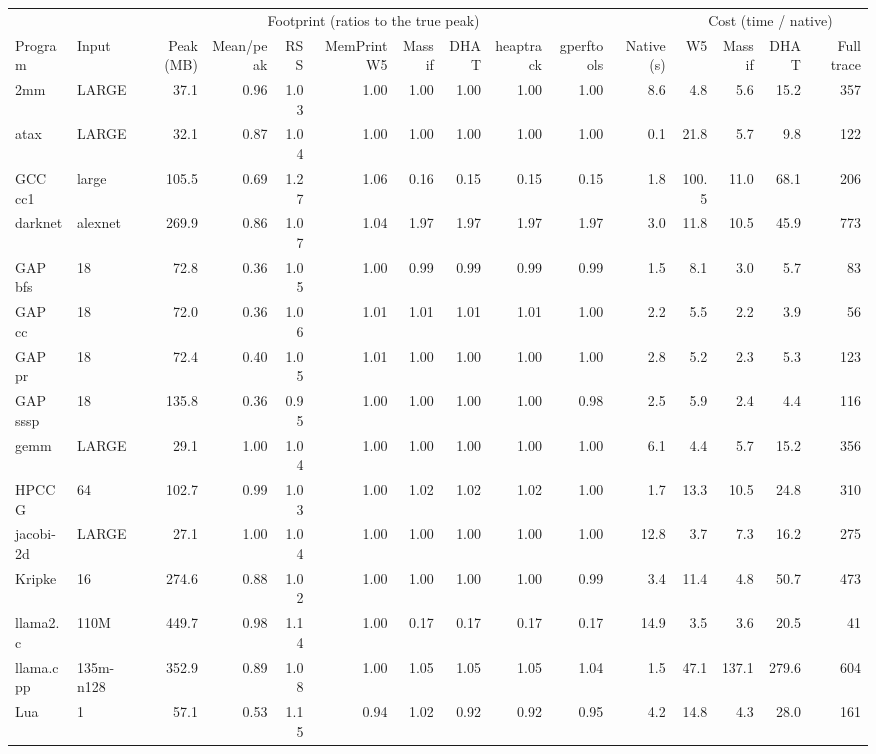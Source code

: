 \begin{tabular}{llrrrrrrrrrrrrr}
\toprule
 & & \multicolumn{8}{c}{Footprint (ratios to the true peak)} & & \multicolumn{4}{c}{Cost (time / native)} \\
\cmidrule(lr){3-10} \cmidrule(lr){12-15}
Program & Input & Peak (MB) & Mean/peak & RSS & MemPrint W5 & Massif & DHAT & heaptrack & gperftools & Native (s) & W5 & Massif & DHAT & Full trace \\
\midrule
2mm & LARGE & 37.1 & 0.96 & 1.03 & 1.00 & 1.00 & 1.00 & 1.00 & 1.00 & 8.6 & 4.8 & 5.6 & 15.2 & 357 \\
atax & LARGE & 32.1 & 0.87 & 1.04 & 1.00 & 1.00 & 1.00 & 1.00 & 1.00 & 0.1 & 21.8 & 5.7 & 9.8 & 122 \\
GCC cc1 & large & 105.5 & 0.69 & 1.27 & 1.06 & 0.16 & 0.15 & 0.15 & 0.15 & 1.8 & 100.5 & 11.0 & 68.1 & 206 \\
darknet & alexnet & 269.9 & 0.86 & 1.07 & 1.04 & 1.97 & 1.97 & 1.97 & 1.97 & 3.0 & 11.8 & 10.5 & 45.9 & 773 \\
GAP bfs & 18 & 72.8 & 0.36 & 1.05 & 1.00 & 0.99 & 0.99 & 0.99 & 0.99 & 1.5 & 8.1 & 3.0 & 5.7 & 83 \\
GAP cc & 18 & 72.0 & 0.36 & 1.06 & 1.01 & 1.01 & 1.01 & 1.01 & 1.00 & 2.2 & 5.5 & 2.2 & 3.9 & 56 \\
GAP pr & 18 & 72.4 & 0.40 & 1.05 & 1.01 & 1.00 & 1.00 & 1.00 & 1.00 & 2.8 & 5.2 & 2.3 & 5.3 & 123 \\
GAP sssp & 18 & 135.8 & 0.36 & 0.95 & 1.00 & 1.00 & 1.00 & 1.00 & 0.98 & 2.5 & 5.9 & 2.4 & 4.4 & 116 \\
gemm & LARGE & 29.1 & 1.00 & 1.04 & 1.00 & 1.00 & 1.00 & 1.00 & 1.00 & 6.1 & 4.4 & 5.7 & 15.2 & 356 \\
HPCCG & 64 & 102.7 & 0.99 & 1.03 & 1.00 & 1.02 & 1.02 & 1.02 & 1.00 & 1.7 & 13.3 & 10.5 & 24.8 & 310 \\
jacobi-2d & LARGE & 27.1 & 1.00 & 1.04 & 1.00 & 1.00 & 1.00 & 1.00 & 1.00 & 12.8 & 3.7 & 7.3 & 16.2 & 275 \\
Kripke & 16 & 274.6 & 0.88 & 1.02 & 1.00 & 1.00 & 1.00 & 1.00 & 0.99 & 3.4 & 11.4 & 4.8 & 50.7 & 473 \\
llama2.c & 110M & 449.7 & 0.98 & 1.14 & 1.00 & 0.17 & 0.17 & 0.17 & 0.17 & 14.9 & 3.5 & 3.6 & 20.5 & 41 \\
llama.cpp & 135m-n128 & 352.9 & 0.89 & 1.08 & 1.00 & 1.05 & 1.05 & 1.05 & 1.04 & 1.5 & 47.1 & 137.1 & 279.6 & 604 \\
Lua & 1 & 57.1 & 0.53 & 1.15 & 0.94 & 1.02 & 0.92 & 0.92 & 0.95 & 4.2 & 14.8 & 4.3 & 28.0 & 161 \\

\end{tabular}
